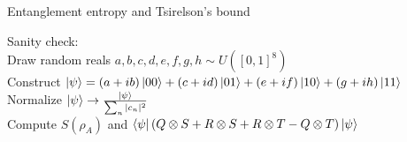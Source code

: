 \documentclass[aspectratio=1610]{beamer}					%
\begin{document}
\begin{frame}{Entanglement entropy and Tsirelson's bound}

Sanity check:\\
\vspace{0.2in}
Draw random reals $a,b,c,d,e,f,g,h\sim U([0,1]^{8})$\\
\vspace{0.2in}
Construct $\ket{\psi} = (a+ib)\ket{00} + (c+id)\ket{01} + (e+if)\ket{10} + (g+ih)\ket{11}$\\
\vspace{0.2in}
Normalize $\ket{\psi} \rightarrow \frac{\ket{\psi}}{\sum_{n}|c_{n}|^{2}}$\\
\vspace{0.2in}
Compute $S(\rho_{A})$ and $\bra{\psi}(Q\otimes S + R\otimes S  + R\otimes T  - Q\otimes T)\ket{\psi}$
\end{frame}
\end{document}
